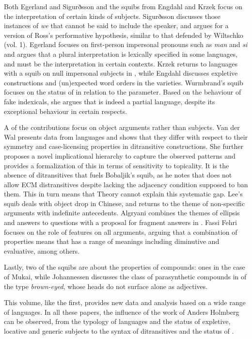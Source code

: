 \documentclass[output=paper]{langsci/langscibook}
\begin{document}
Both Egerland and Sigurðsson and the squibs from Engdahl and Krzek focus on the interpretation of certain kinds of subjects. Sigurðsson discusses those instances of \textit{we} that cannot be said to include the speaker, and argues for a version of Ross’s performative hypothesis, similar to that defended by Wiltschko (vol. 1). Egerland focuses on first-person impersonal pronouns such as  \textit{man} and  \textit{si} and argues that a plural interpretation is lexically specified in some languages, and must be the interpretation in certain contexts. Krzek returns to  languages with a squib on null impersonal subjects in , while Engdahl discusses expletive  constructions and (un)expected word orders in the  varieties. Wurmbrand’s squib focuses on the status of  in relation to the  parameter. Based on the behaviour of fake indexicals, she argues that  is indeed a partial  language, despite its exceptional behaviour in certain respects. 

A  of the contributions focus on object arguments rather than subjects. Van der Wal presents data from  languages and shows that they differ with respect to their symmetry and case-licensing properties in ditransitive constructions. She further proposes a novel implicational hierarchy to capture the observed patterns and provides a formalization of this in terms of sensitivity to topicality. It is the absence of ditransitives that fuels Bobaljik’s squib, as he notes that  does not allow ECM distransitives despite lacking the adjacency condition supposed to ban them. This in turn means that  Theory cannot explain this systematic gap. Lee’s squib deals with object drop in Chinese, and returns to the theme of non-specific arguments with indefinite antecedents. Algryani combines the themes of ellipsis and answers to questions with a proposal for fragment answers in . Fassi Fehri focuses on the role of  features on all arguments, arguing that a combination of properties means that  has a range of meanings including diminutive and evaluative, among others. 

Lastly, two of the squibs are about the properties of compounds:  ones in the case of Mukai, while Johannessen discusses the class of parasynthetic compounds in  of the type \textit{brown-eyed}, whose heads do not surface alone as adjectives. 

\newpage 
This volume, like the first, provides new data and analysis based on a wide range of languages. In all these papers, the influence of the work of Anders Holmberg can be observed, from the typology of  languages and the status of expletive, locative and generic subjects to the syntax of ditransitives and the status of . 
\end{document}
